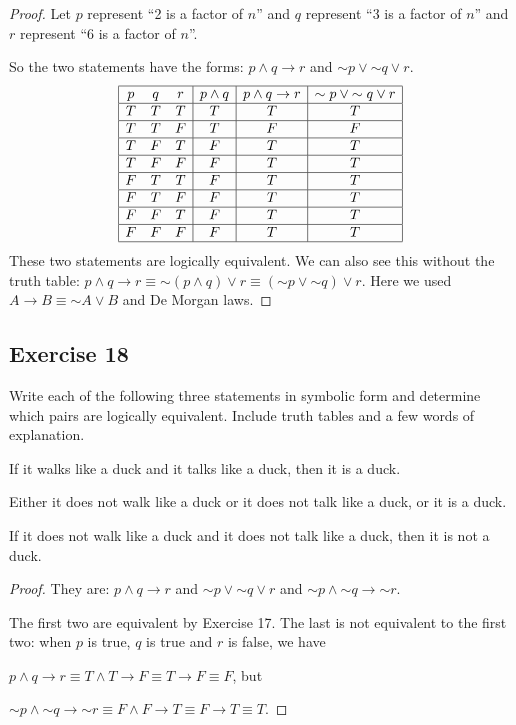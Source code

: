 \documentclass[14pt]{extarticle}
\begin{document}
\begin{proof}
Let $p$ represent “2 is a factor of $n$” and $q$ represent “3 is a factor of $n$” and $r$ represent ``6 is a factor of $n$''.

So the two statements have the forms: $p \wedge q \to r$ and ${\sim p} \vee {\sim q} \vee r$.
$$
\begin{array}{|ccc|c|c|c|}
\hline
p & q & r & p \wedge q & p \wedge q \to r & {\sim p} \vee {\sim q} \vee r \\
\hline
T & T & T & T & T & T \\
\hline
T & T & F & T & F & F \\
\hline
T & F & T & F & T & T \\
\hline
T & F & F & F & T & T \\
\hline
F & T & T & F & T & T \\
\hline
F & T & F & F & T & T \\
\hline
F & F & T & F & T & T \\
\hline
F & F & F & F & T & T \\
\hline
\end{array}
$$
These two statements are logically equivalent. We can also see this without the truth table: $p \wedge q \to r \equiv {\sim (p \wedge q)} \vee r \equiv ({\sim p} \vee {\sim q}) \vee r$. Here we used $A \to B \equiv {\sim A} \vee B$ and De Morgan laws. \end{proof}

\subsection{Exercise 18}
Write each of the following three statements in symbolic form and determine which pairs are logically equivalent. Include truth tables and a few words of explanation.

If it walks like a duck and it talks like a duck, then it is a duck.

Either it does not walk like a duck or it does not talk like a duck, or it is a duck.

If it does not walk like a duck and it does not talk like a duck, then it is not a duck.

\begin{proof}
They are: $p \wedge q \to r$ and ${\sim p} \vee {\sim q} \vee r$ and ${\sim p} \wedge {\sim q} \to {\sim r}$.

The first two are equivalent by Exercise 17. The last is not equivalent to the first two: when $p$ is true, $q$ is true and $r$ is false, we have

$p \wedge q \to r \equiv T \wedge T \to F \equiv T \to F \equiv F$, but

${\sim p} \wedge {\sim q} \to {\sim r} \equiv F \wedge F \to T \equiv F \to T \equiv T$.
\end{proof}
\end{document}
